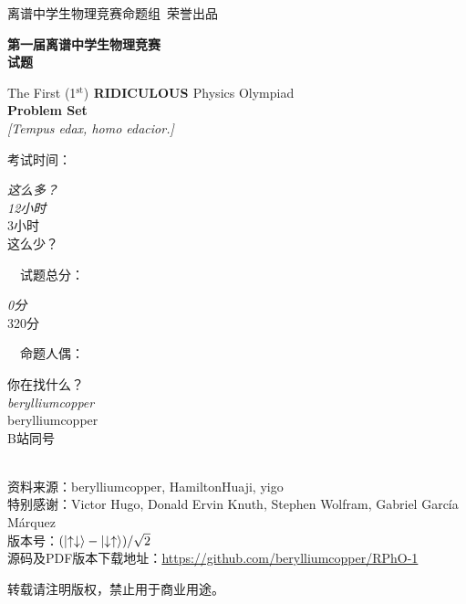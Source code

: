 \documentclass[11pt,a4paper,onecolumn,UTF8]{ctexart}
\begin{document}
	\newcommand{\ui}{\mathbbm{i}}
	\newcommand{\ud}{\mathrm{d}}
	\newcommand{\ue}{\mathbbm{e}}
	\newcommand{\uT}{\mathrm{T}}
	
	
	\pagestyle{fancy}
	
	{\large 离谱中学生物理竞赛命题组\,\,\,荣誉出品}\\[2ex]
	
	
	
	\thispagestyle{empty}
	\begin{center}
		\textbf{\LARGE{第一届\;}}\textbf{\huge{离谱}}\textbf{\LARGE{\;中学生物理竞赛}}\\[5ex]
		
		\textbf{\Huge{试题}}\\[10ex]
		
	\end{center}
	
	\begin{center}
		\Large{The First (1${}^{\text{st}}$)\;}\textbf{\LARGE{ RIDICULOUS }}\Large{\;Physics Olympiad}\\[5ex]
		
		\textbf{\huge{Problem Set}}\\[7ex]
		
		{\Large \textit{[Tempus edax, homo edacior.]}}\\[10ex]
		
	\end{center}
	
	{\normalfont 考试时间：\begin{minipage}{10ex}\textit{\color{white}这么多？}\\{\textit{12小时}\\3小时\\{\color{white}这么少？}}\end{minipage}\,\,\,\,\,\,试题总分：\begin{minipage}{8ex}{\textit{0分}\\320分}\end{minipage}\,\,\,\,\,\,命题人{\color{white}偶}：\begin{minipage}{20ex}{\color{white}你在找什么？}\\{\textit{berylliumcopper}\\berylliumcopper}\\{\color{white}B站同号}\end{minipage}\\[1ex]
	
	资料来源：berylliumcopper, HamiltonHuaji, yigo\\[1ex]
	
	特别感谢：Victor Hugo, Donald Ervin Knuth, Stephen Wolfram, Gabriel García Márquez\\[1ex]
	
	版本号：$(\ket{\uparrow\downarrow}-\ket{\downarrow\uparrow})/\sqrt{2}$\\[1ex]
	
	源码及PDF版本下载地址：\href{https://github.com/berylliumcopper/RPhO-1}{https://github.com/berylliumcopper/RPhO-1}
	
	转载请注明版权，禁止用于商业用途。}
	
\end{document}
